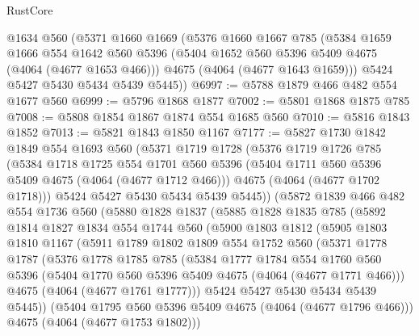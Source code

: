 \begin{lexlean}{RustCore}
\begin{coremodule}
    @1634
    @560
    (@5371
      @1660
      @1669
      (@5376
        @1660
        @1667
        @785
        (@5384
          @1659
          @1666
          @554
          @1642
          @560
          @5396
          (@5404 @1652 @560 @5396 @5409 @4675 (@4064 (@4677 @1653 @466)))
          @4675
          (@4064 (@4677 @1643 @1659)))
        @5424
        @5427
        @5430
        @5434
        @5439
        @5445))
@6997 := @5788 @1879 @466 @482 @554 @1677 @560
@6999 := @5796 @1868 @1877
@7002 := @5801 @1868 @1875 @785
@7008 := @5808 @1854 @1867 @1874 @554 @1685 @560
@7010 := @5816 @1843 @1852
@7013 := @5821 @1843 @1850 @1167
@7177 := @5827
    @1730
    @1842
    @1849
    @554
    @1693
    @560
    (@5371
      @1719
      @1728
      (@5376
        @1719
        @1726
        @785
        (@5384
          @1718
          @1725
          @554
          @1701
          @560
          @5396
          (@5404 @1711 @560 @5396 @5409 @4675 (@4064 (@4677 @1712 @466)))
          @4675
          (@4064 (@4677 @1702 @1718)))
        @5424
        @5427
        @5430
        @5434
        @5439
        @5445))
    (@5872
      @1839
      @466
      @482
      @554
      @1736
      @560
      (@5880
        @1828
        @1837
        (@5885
          @1828
          @1835
          @785
          (@5892
            @1814
            @1827
            @1834
            @554
            @1744
            @560
            (@5900
              @1803
              @1812
              (@5905
                @1803
                @1810
                @1167
                (@5911
                  @1789
                  @1802
                  @1809
                  @554
                  @1752
                  @560
                  (@5371
                    @1778
                    @1787
                    (@5376
                      @1778
                      @1785
                      @785
                      (@5384
                        @1777
                        @1784
                        @554
                        @1760
                        @560
                        @5396
                        (@5404 @1770 @560 @5396 @5409 @4675 (@4064 (@4677 @1771 @466)))
                        @4675
                        (@4064 (@4677 @1761 @1777)))
                      @5424
                      @5427
                      @5430
                      @5434
                      @5439
                      @5445))
                  (@5404 @1795 @560 @5396 @5409 @4675 (@4064 (@4677 @1796 @466)))
                  @4675
                  (@4064 (@4677 @1753 @1802)))

\end{coremodule}
\end{lexlean}
